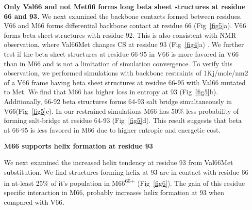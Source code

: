 \documentclass[10pt,letterpaper]{article}
\begin{document}
\textbf{Only Val66 and not Met66 forms long beta sheet structures at residue 66 and 93.} We next examined the backbone contacts formed between residues.
V66 and M66 forms differential backbone contact at residue 66 (Fig~\ref{fig5}a). V66 forms beta sheet structures with residue 92. This is also consistent with NMR observation, where Val66Met changes CS at residue 93 (Fig~\ref{fig4}a) . 
We further test if the beta sheet structures at residue 66-95 in V66 is more favored in V66 than in M66 and is not a limitation of simulation convergence. To verify this observation, we performed simulations with backbone restraints of 1Kj/mole/nm2 of a V66 frame having beta sheet structures at residue 66-95 with Val66 mutated to Met. We find that M66 has higher loss in entropy at 93 (Fig~\ref{fig5}b). Additionally, 66-92 beta structures forms 64-93 salt bridge simultaneously in V66(Fig~\ref{fig5}c). In our restrained simulations M66 has 50\% less probability of forming salt-bridge at residue 64-93 (Fig~\ref{fig5}d). This result suggests that beta at 66-95 is less favored in M66 due to higher entropic and energetic cost. 


\textbf{M66 supports helix formation at residue 93}

We next examined the increased helix tendency at residue 93 from Val66Met substitution. We find structures forming helix at 93 are in contact with residue 66 in at-least 25\% of it's population in M66\textsuperscript{65+} (Fig~\ref{fig6}). The gain of this residue specific interaction in M66, probably increases helix formation at 93 when compared with V66. 
\end{document}

